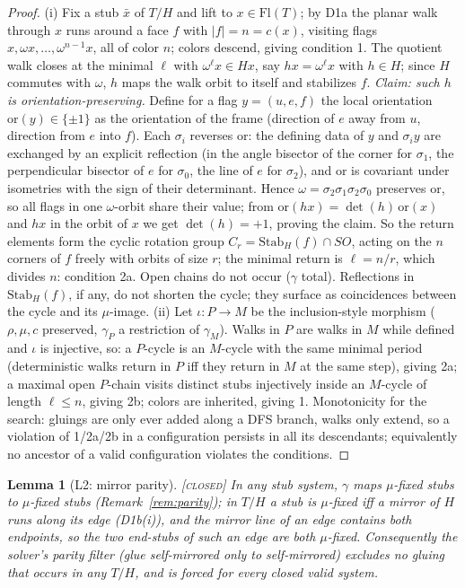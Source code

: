 \documentclass[11pt]{article}
\newtheorem{lemma}[theorem]{Lemma}
\theoremstyle{definition}
\newcommand{\CLOSED}{\textnormal{\textsc{[closed]}}}
\newcommand{\Flags}{\mathrm{Fl}}
\newcommand{\Stab}{\mathrm{Stab}}
\begin{document}
\begin{proof}
(i) Fix a stub $\bar x$ of $T/H$ and lift to $x \in \Flags(T)$; by D1a the planar walk
through $x$ runs around a face $f$ with $|f| = n = c(x)$, visiting flags
$x, \omega x, \dots, \omega^{n-1}x$, all of color $n$; colors descend, giving condition 1.
The quotient walk closes at the minimal $\ell$ with $\omega^\ell x \in Hx$, say
$h x = \omega^\ell x$ with $h \in H$; since $H$ commutes with $\omega$, $h$ maps the
walk orbit to itself and stabilizes $f$. \emph{Claim: such $h$ is orientation-preserving.}
Define for a flag $y = (u, e, f)$ the local orientation $\mathrm{or}(y) \in \{\pm 1\}$ as
the orientation of the frame (direction of $e$ away from $u$, direction from $e$ into
$f$). Each $\sigma_i$ reverses $\mathrm{or}$: the defining data of $y$ and $\sigma_i y$
are exchanged by an explicit reflection (in the angle bisector of the corner for
$\sigma_1$, the perpendicular bisector of $e$ for $\sigma_0$, the line of $e$ for
$\sigma_2$), and $\mathrm{or}$ is covariant under isometries with the sign of their
determinant. Hence $\omega = \sigma_2\sigma_1\sigma_2\sigma_0$ preserves $\mathrm{or}$,
so all flags in one $\omega$-orbit share their value; from
$\mathrm{or}(hx) = \det(h)\,\mathrm{or}(x)$ and $hx$ in the orbit of $x$ we get
$\det(h) = +1$, proving the claim. So the return elements form the cyclic rotation group
$C_r = \Stab_H(f) \cap SO$, acting on the $n$ corners of $f$ freely with orbits of size
$r$; the minimal return is $\ell = n/r$, which divides $n$: condition 2a. Open chains do
not occur ($\gamma$ total). Reflections in $\Stab_H(f)$, if any, do not shorten the
cycle; they surface as coincidences between the cycle and its $\mu$-image.
(ii) Let $\iota : P \to M$ be the inclusion-style morphism ($\rho,\mu,c$ preserved,
$\gamma_P$ a restriction of $\gamma_M$). Walks in $P$ are walks in $M$ while defined and
$\iota$ is injective, so: a $P$-cycle is an $M$-cycle with the same minimal period
(deterministic walks return in $P$ iff they return in $M$ at the same step), giving 2a;
a maximal open $P$-chain visits distinct stubs injectively inside an $M$-cycle of length
$\ell \le n$, giving 2b; colors are inherited, giving 1. Monotonicity for the search:
gluings are only ever added along a DFS branch, walks only extend, so a violation of
1/2a/2b in a configuration persists in all its descendants; equivalently no ancestor of a
valid configuration violates the conditions.
\end{proof}

\begin{lemma}[L2: mirror parity]\label{lem:L2} \CLOSED\;
In any stub system, $\gamma$ maps $\mu$-fixed stubs to $\mu$-fixed stubs
(Remark~\ref{rem:parity}); in $T/H$ a stub is $\mu$-fixed iff a mirror of $H$ runs along
its edge (D1b(i)), and the mirror line of an edge contains both endpoints, so the two
end-stubs of such an edge are both $\mu$-fixed. Consequently the solver's parity filter
(glue self-mirrored only to self-mirrored) excludes no gluing that occurs in any $T/H$,
and is forced for every closed valid system.
\end{lemma}
\end{document}
